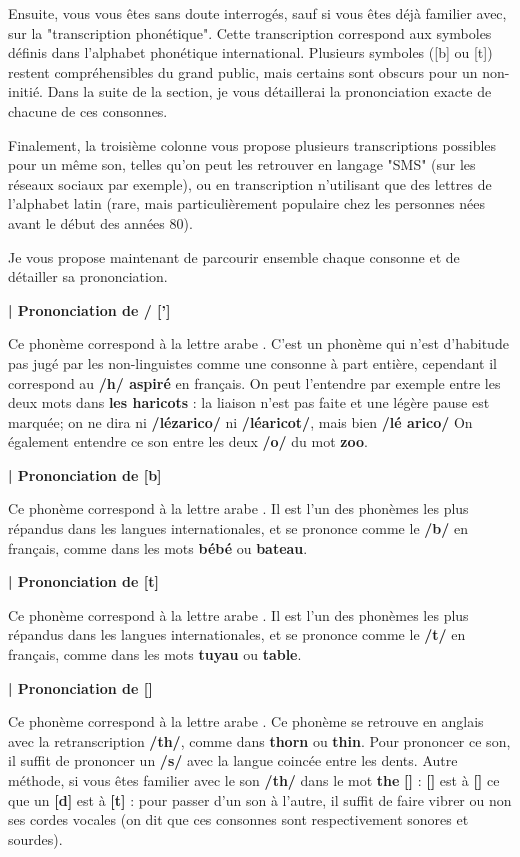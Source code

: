 Ensuite, vous vous êtes sans doute interrogés, sauf si vous êtes déjà familier avec, sur la "transcription phonétique". Cette transcription correspond aux symboles définis dans l'alphabet phonétique international. Plusieurs symboles ([b] ou [t]) restent compréhensibles du grand public, mais certains sont obscurs pour un non-initié. Dans la suite de la section, je vous détaillerai la prononciation exacte de chacune de ces consonnes.

Finalement, la troisième colonne vous propose plusieurs transcriptions possibles pour un même son, telles qu'on peut les retrouver en langage "SMS" (sur les réseaux sociaux par exemple), ou en transcription n'utilisant que des lettres de l'alphabet latin (rare, mais particulièrement populaire chez les personnes nées avant le début des années 80).

Je vous propose maintenant de parcourir ensemble chaque consonne et de détailler sa prononciation.


\textbf{| Prononciation de  /  [']}

Ce phonème correspond à la lettre arabe . C'est un phonème qui n'est d'habitude pas jugé par les non-linguistes comme une consonne à part entière, cependant il correspond au \textbf{/h/ aspiré} en français. On peut l'entendre par exemple entre les deux mots dans \textbf{les haricots} : la liaison n'est pas faite et une légère pause est marquée; on ne dira ni \textbf{/lézarico/} ni \textbf{/léaricot/}, mais bien \textbf{/lé arico/} On également entendre ce son entre les deux \textbf{/o/} du mot \textbf{zoo}.


\textbf{| Prononciation de  [b]}

Ce phonème correspond à la lettre arabe . Il est l'un des phonèmes les plus répandus dans les langues internationales, et se prononce comme le \textbf{/b/} en français, comme dans les mots \textbf{bébé} ou \textbf{bateau}.



\textbf{| Prononciation de  [t]}

Ce phonème correspond à la lettre arabe . Il est l'un des phonèmes les plus répandus dans les langues internationales, et se prononce comme le \textbf{/t/} en français, comme dans les mots \textbf{tuyau} ou \textbf{table}.



\textbf{| Prononciation de  [\texttheta]}

Ce phonème correspond à la lettre arabe . Ce phonème se retrouve en anglais avec la retranscription \textbf{/th/}, comme dans \textbf{thorn} ou \textbf{thin}. Pour prononcer ce son, il suffit de prononcer un \textbf{/s/} avec la langue coincée entre les dents. Autre méthode, si vous êtes familier avec le son \textbf{/th/} dans le mot \textbf{the} \textbf{[\dh]} : \textbf{[\dh]} est à \textbf{[\texttheta]} ce que un \textbf{[d]} est à \textbf{[t]} : pour passer d'un son à l'autre, il suffit de faire vibrer ou non ses cordes vocales (on dit que ces consonnes sont respectivement sonores et sourdes).

